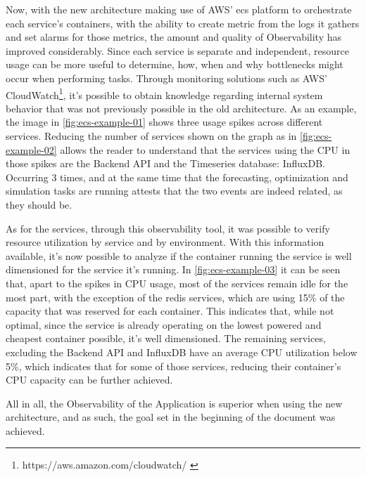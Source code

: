 Now, with the new architecture making use of AWS' \gls{ecs} platform to orchestrate each service's containers, with the ability to create metric from the logs it gathers and set alarms for those metrics, the amount and quality of Observability has improved considerably. Since each service is separate and independent, resource usage can be more useful to determine, how, when and why bottlenecks might occur when performing tasks.
Through monitoring solutions such as AWS' CloudWatch\footnote{https://aws.amazon.com/cloudwatch/ \label{foot:cloudwatch}}, it's possible to obtain knowledge regarding internal system behavior that was not previously possible in the old architecture.
As an example, the image in \cref{fig:ecs-example-01} shows three usage spikes across different services. Reducing the number of services shown on the graph as in \cref{fig:ecs-example-02} allows the reader to understand that the services using the CPU in those spikes are the Backend API and the Timeseries database: InfluxDB.
Occurring 3 times, and at the same time that the forecasting, optimization and simulation tasks are running attests that the two events are indeed related, as they should be.

As for the services, through this observability tool, it was possible to verify resource utilization by service and by environment. With this information available, it's now possible to analyze if the container running the service is well dimensioned for the service it's running. In \cref{fig:ecs-example-03} it can be seen that, apart to the spikes in CPU usage, most of the services remain idle for the most part, with the exception of the redis services, which are using 15\% of the capacity that was reserved for each container. This indicates that, while not optimal, since the service is already operating on the lowest powered and cheapest container possible, it's well dimensioned. The remaining services, excluding the Backend API and InfluxDB have an average CPU utilization below 5\%, which indicates that for some of those services, reducing their container's CPU capacity can be further achieved.




 

 

All in all, the Observability of the Application is superior when using the new architecture, and as such, the goal set in the beginning of the document was achieved.